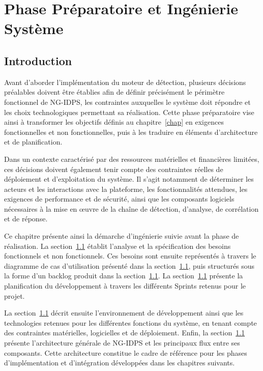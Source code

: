 
\chapter{Phase Préparatoire et Ingénierie Système}
\label{chap:chap2}

\minitoc
\newpage

\section{Introduction}

\label{sec}

Avant d'aborder l'implémentation du moteur de détection, plusieurs décisions préalables doivent être établies afin de définir précisément le périmètre fonctionnel de NG-IDPS, les contraintes auxquelles le système doit répondre et les choix technologiques permettant sa réalisation. Cette phase préparatoire vise ainsi à transformer les objectifs définis au chapitre~\ref{chap} en exigences fonctionnelles et non fonctionnelles, puis à les traduire en éléments d'architecture et de planification.

Dans un contexte caractérisé par des ressources matérielles et financières limitées, ces décisions doivent également tenir compte des contraintes réelles de déploiement et d'exploitation du système. Il s'agit notamment de déterminer les acteurs et les interactions avec la plateforme, les fonctionnalités attendues, les exigences de performance et de sécurité, ainsi que les composants logiciels nécessaires à la mise en œuvre de la chaîne de détection, d'analyse, de corrélation et de réponse.

Ce chapitre présente ainsi la démarche d'ingénierie suivie avant la phase de réalisation. La section~\ref{sec} établit l'analyse et la spécification des besoins fonctionnels et non fonctionnels. Ces besoins sont ensuite représentés à travers le diagramme de cas d'utilisation présenté dans la section~\ref{sec}, puis structurés sous la forme d'un backlog produit dans la section~\ref{sec}. La section~\ref{sec} présente la planification du développement à travers les différents Sprints retenus pour le projet.

La section~\ref{sec} décrit ensuite l'environnement de développement ainsi que les technologies retenues pour les différentes fonctions du système, en tenant compte des contraintes matérielles, logicielles et de déploiement. Enfin, la section~\ref{sec} présente l'architecture générale de NG-IDPS et les principaux flux entre ses composants. Cette architecture constitue le cadre de référence pour les phases d'implémentation et d'intégration développées dans les chapitres suivants.


